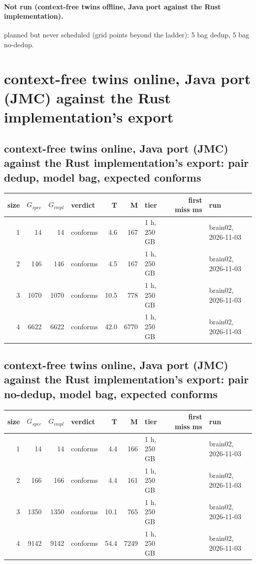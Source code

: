 \documentclass[10pt]{article}
\begin{document}
\paragraph{Not run (context-free twins offline, Java port against the Rust implementation).}
planned but never scheduled (grid points beyond the ladder): 5 bag dedup, 5 bag no-dedup.\par
\section*{context-free twins online, Java port (JMC) against the Rust implementation's export}
\subsection*{context-free twins online, Java port (JMC) against the Rust implementation's export: pair \textsf{dedup}, model bag, expected conforms}
\begin{longtable}{@{}rrrlrrlrl@{}}
\toprule
size & $G_{\mathit{spec}}$ & $G_{\mathit{impl}}$ & verdict & T & M & tier & first miss ms & run \\
\midrule
\endhead
\color{red} 1 & 14 & 14 & conforms & 4.6 & 167 & 1 h, 250 GB &  & brain02, 2026-11-03 \\
\color{red} 2 & 146 & 146 & conforms & 4.5 & 167 & 1 h, 250 GB &  & brain02, 2026-11-03 \\
\color{red} 3 & 1070 & 1070 & conforms & 10.5 & 778 & 1 h, 250 GB &  & brain02, 2026-11-03 \\
\color{red} 4 & 6622 & 6622 & conforms & 42.0 & 6770 & 1 h, 250 GB &  & brain02, 2026-11-03 \\
\bottomrule
\end{longtable}
\subsection*{context-free twins online, Java port (JMC) against the Rust implementation's export: pair \textsf{no-dedup}, model bag, expected conforms}
\begin{longtable}{@{}rrrlrrlrl@{}}
\toprule
size & $G_{\mathit{spec}}$ & $G_{\mathit{impl}}$ & verdict & T & M & tier & first miss ms & run \\
\midrule
\endhead
\color{red} 1 & 14 & 14 & conforms & 4.4 & 166 & 1 h, 250 GB &  & brain02, 2026-11-03 \\
\color{red} 2 & 166 & 166 & conforms & 4.4 & 161 & 1 h, 250 GB &  & brain02, 2026-11-03 \\
\color{red} 3 & 1350 & 1350 & conforms & 10.1 & 765 & 1 h, 250 GB &  & brain02, 2026-11-03 \\
\color{red} 4 & 9142 & 9142 & conforms & 54.4 & 7249 & 1 h, 250 GB &  & brain02, 2026-11-03 \\
\bottomrule
\end{longtable}
\end{document}
